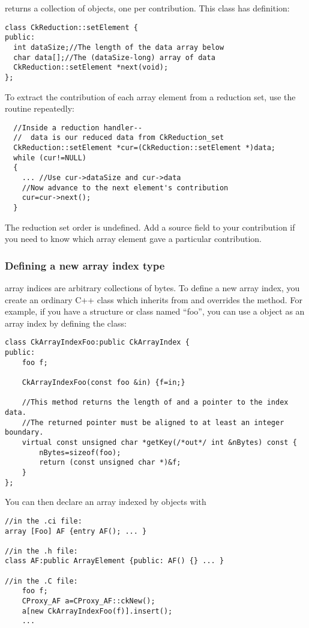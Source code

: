  returns a collection of  objects, one per contribution.  This class has definition:
\begin{verbatim}
class CkReduction::setElement {
public:
  int dataSize;//The length of the data array below
  char data[];//The (dataSize-long) array of data
  CkReduction::setElement *next(void);
};
\end{verbatim}

To extract the contribution of each array element from a reduction set, use the  routine repeatedly:
\begin{verbatim}
  //Inside a reduction handler-- 
  //  data is our reduced data from CkReduction_set
  CkReduction::setElement *cur=(CkReduction::setElement *)data;
  while (cur!=NULL)
  {
    ... //Use cur->dataSize and cur->data
    //Now advance to the next element's contribution
    cur=cur->next();
  }
\end{verbatim}

The reduction set order is undefined.  Add a source field to your contribution if you need to know which array element gave a particular contribution.

\subsubsection{Defining a new array index type}
\charmpp array indices are arbitrary collections of bytes.
To define a new array index, you create an ordinary C++ class 
which inherits from  and overrides the  method.  
For example, if you have a structure or class named ``foo'', you 
can use a  object as an array index by defining the class:

\begin{verbatim}
class CkArrayIndexFoo:public CkArrayIndex {
public:
    foo f;

    CkArrayIndexFoo(const foo &in) {f=in;}

    //This method returns the length of and a pointer to the index data.
    //The returned pointer must be aligned to at least an integer boundary.
    virtual const unsigned char *getKey(/*out*/ int &nBytes) const {
      	nBytes=sizeof(foo);
        return (const unsigned char *)&f;
    }
};
\end{verbatim}

You can then declare an array indexed by  objects with

\begin{verbatim}
//in the .ci file:
array [Foo] AF {entry AF(); ... }

//in the .h file:
class AF:public ArrayElement {public: AF() {} ... }

//in the .C file:
    foo f;
    CProxy_AF a=CProxy_AF::ckNew();
    a[new CkArrayIndexFoo(f)].insert();
    ...
\end{verbatim}

